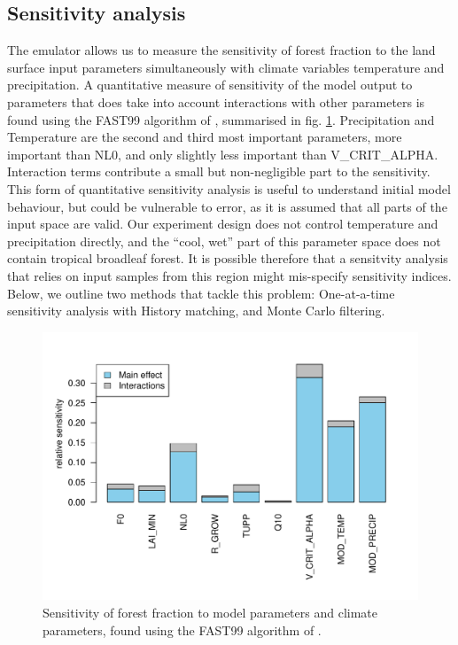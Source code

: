 \documentclass[gmd, manuscript]{copernicus}
\begin{document}
\subsection{Sensitivity analysis}\label{ssec:sensitivity}
The emulator allows us to measure the sensitivity of forest fraction to the land surface input parameters simultaneously with climate variables temperature and precipitation. A quantitative measure of sensitivity of the model output to parameters that does take into account interactions with other parameters is found using the FAST99 algorithm of \cite{saltelli1999sensitivity}, summarised in fig. \ref{fig:fast_barplot}. Precipitation and Temperature are the second and third most important parameters, more important than NL0, and only slightly less important than V\_CRIT\_ALPHA. Interaction terms contribute a small but non-negligible part to the sensitivity. This form of quantitative sensitivity analysis is useful to understand initial model behaviour, but could be vulnerable to error, as it is assumed that all parts of the input space are valid. Our experiment design does not control temperature and precipitation directly, and the ``cool, wet'' part of this parameter space does not contain tropical broadleaf forest. It is possible therefore that a sensitvity analysis that relies on input samples from this region might mis-specify sensitivity indices. Below, we outline two methods that tackle this problem: One-at-a-time sensitivity analysis with History matching, and Monte Carlo filtering.

\begin{figure}[t]
\includegraphics[width=12cm]{../graphics/fast_barplot.pdf}
\caption{Sensitivity of forest fraction to model parameters and climate parameters, found using the FAST99 algorithm of \cite{saltelli1999sensitivity}.
}
\label{fig:fast_barplot}
\end{figure}
\end{document}
